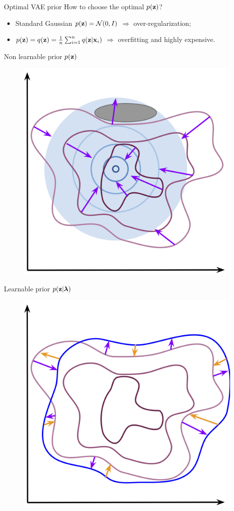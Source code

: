 \begin{frame}{Optimal VAE prior}
	How to choose the optimal $p(\mathbf{z})$?
	\begin{itemize}
		\item Standard Gaussian $p(\mathbf{z}) = \mathcal{N}(0, I)$ $\Rightarrow$ over-regularization;
		\item $p(\mathbf{z}) = q(\mathbf{z}) = \frac{1}{n}\sum_{i=1}^n q(\mathbf{z} | \mathbf{x}_i)$ $\Rightarrow$ overfitting and highly expensive.
	\end{itemize}
	\vspace{-0.3cm}
	\begin{minipage}[t]{0.5\columnwidth}
		\begin{block}{Non learnable prior $p(\mathbf{z})$}
			\begin{figure}[h]
				\centering
				\includegraphics[width=0.8\linewidth]{figs/non_learnable_prior}
			\end{figure}
		\end{block}
	\end{minipage}%
	\begin{minipage}[t]{0.5\columnwidth}
		\begin{block}{Learnable prior $p(\mathbf{z} | \boldsymbol{\lambda})$}
			\begin{figure}[h]
				\centering
				\includegraphics[width=0.8\linewidth]{figs/learnable_prior}

\end{figure}
\end{block}
\end{minipage}
\end{frame}
